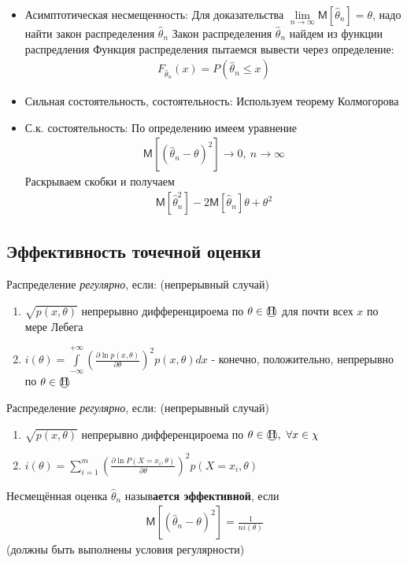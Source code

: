 \documentclass[12pt]{article}
\newcommand{\M}{\mathsf{M}}
\begin{document}
\begin{itemize}
    \itemsep0em
    \item Асимптотическая несмещенность:
        \subitem Для доказательства $\lim\limits_{n\rightarrow \infty}\M
        [\widehat{\theta}_{n}]=\theta$, надо найти закон распределения
        $\widehat{\theta}_{n}$
        \subitem Закон распределения $\widehat{\theta}_{n}$ найдем из
        функции распредления
        \subitem Функция распределения пытаемся вывести через
        определение:
        \begin{eqnarray*}
            F_{\widehat{\theta}_{n}}(x)=P(\widehat{\theta}_{n}\leqslant x)
        \end{eqnarray*}
    \item Сильная состоятельность, состоятельность: Используем теорему Колмогорова
    \item С.к. состоятельность:
        \subitem По определению имеем уравнение
        \begin{eqnarray*}
            \M [(\widehat{\theta}_{n}-\theta)^{2}] \to 0,\ n\to\infty
        \end{eqnarray*}
        \subitem Раскрываем скобки и получаем
        \begin{eqnarray*}
            \M [\widehat{\theta}_{n}^{2}]-2\M
            [\widehat{\theta}_{n}]\theta +\theta^{2}
        \end{eqnarray*}
\end{itemize}

\subsection{Эффективность точечной оценки}

\par Распределение \textit{регулярно}, если: (непрерывный случай)
\begin{enumerate}
    \itemsep0em
    \item $\sqrt{p(x,\theta)}$ непрерывно дифференцироема по $\theta\in
        \textmd{\textcircled{H}}$ для почти всех $x$ по мере Лебега
    \item $i(\theta)=\int\limits_{-\infty}^{+\infty}
        \left(\frac{\partial\ln
        p(x,\theta)}{\partial\theta}\right)^{2}p(x,\theta)dx$ - конечно,
        положительно, непрерывно по $\theta\in \textmd{\textcircled{H}}$
\end{enumerate}

\par Распределение \textit{регулярно}, если: (непрерывный случай)
\begin{enumerate}
    \itemsep0em
    \item $\sqrt{p(x,\theta)}$ непрерывно дифференцироема по $\theta\in
        \textmd{\textcircled{H}},\ \forall x\in\chi$
    \item $i(\theta)=\sum\limits_{i=1}^{m}
        \left(\frac{\partial\ln
        P(X=x_{i},\theta)}{\partial\theta}\right)^{2}
        p(X=x_{i},\theta)$
\end{enumerate}

Несмещённая оценка $\widehat{\theta}_{n}$ назыв\textbf{ается эффективной},
если
\begin{eqnarray*}
    \M \left[\left(\widehat{\theta}_{n}-\theta\right)^{2}\right]
    =\frac{1}{ni(\theta)}
\end{eqnarray*}
(должны быть выполнены условия регулярности)
\end{document}
